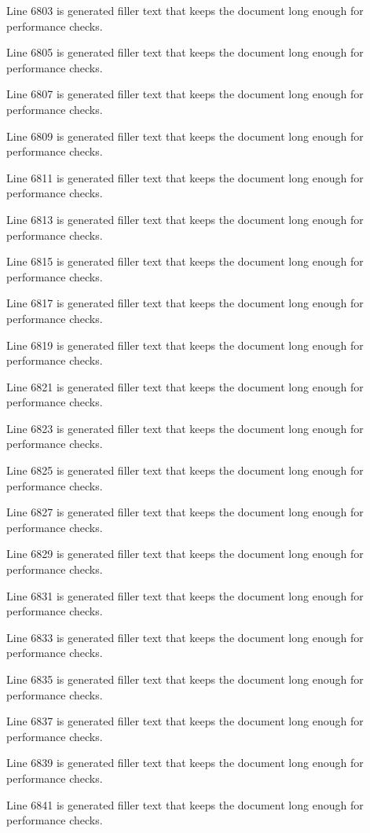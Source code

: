 Line 6803 is generated filler text that keeps the document long enough for performance checks.

Line 6805 is generated filler text that keeps the document long enough for performance checks.

Line 6807 is generated filler text that keeps the document long enough for performance checks.

Line 6809 is generated filler text that keeps the document long enough for performance checks.

Line 6811 is generated filler text that keeps the document long enough for performance checks.

Line 6813 is generated filler text that keeps the document long enough for performance checks.

Line 6815 is generated filler text that keeps the document long enough for performance checks.

Line 6817 is generated filler text that keeps the document long enough for performance checks.

Line 6819 is generated filler text that keeps the document long enough for performance checks.

Line 6821 is generated filler text that keeps the document long enough for performance checks.

Line 6823 is generated filler text that keeps the document long enough for performance checks.

Line 6825 is generated filler text that keeps the document long enough for performance checks.

Line 6827 is generated filler text that keeps the document long enough for performance checks.

Line 6829 is generated filler text that keeps the document long enough for performance checks.

Line 6831 is generated filler text that keeps the document long enough for performance checks.

Line 6833 is generated filler text that keeps the document long enough for performance checks.

Line 6835 is generated filler text that keeps the document long enough for performance checks.

Line 6837 is generated filler text that keeps the document long enough for performance checks.

Line 6839 is generated filler text that keeps the document long enough for performance checks.

Line 6841 is generated filler text that keeps the document long enough for performance checks.

